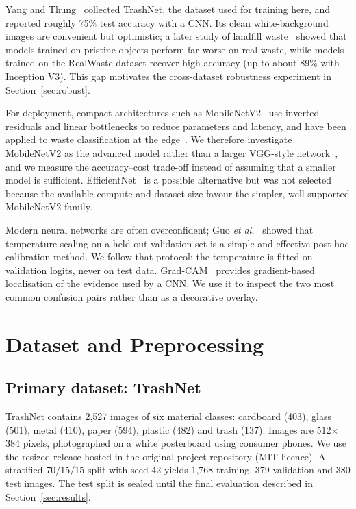 \documentclass[11pt,a4paper]{article}
\begin{document}
Yang and Thung~\citep{yang2016trashnet} collected TrashNet, the dataset used for training
here, and reported roughly 75\% test accuracy with a CNN. Its clean white-background
images are convenient but optimistic; a later study of landfill waste~\citep{single2023realwaste}
showed that models trained on pristine objects perform far worse on real waste, while
models trained on the RealWaste dataset recover high accuracy (up to about 89\% with
Inception V3). This gap motivates the cross-dataset robustness experiment in
Section~\ref{sec:robust}.

For deployment, compact architectures such as MobileNetV2~\citep{sandler2018mobilenetv2}
use inverted residuals and linear bottlenecks to reduce parameters and latency, and have
been applied to waste classification at the edge~\citep{white2020wastenet}. We therefore
investigate MobileNetV2 as the advanced model rather than a larger VGG-style
network~\citep{simonyan2014vgg}, and we measure the accuracy--cost trade-off instead of
assuming that a smaller model is sufficient. EfficientNet~\citep{tan2019efficientnet} is a
possible alternative but was not selected because the available compute and dataset size
favour the simpler, well-supported MobileNetV2 family.

Modern neural networks are often overconfident; Guo \emph{et al.}~\citep{guo2017calibration}
showed that temperature scaling on a held-out validation set is a simple and effective
post-hoc calibration method. We follow that protocol: the temperature is fitted on
validation logits, never on test data. Grad-CAM~\citep{selvaraju2017gradcam} provides
gradient-based localisation of the evidence used by a CNN. We use it to inspect the two
most common confusion pairs rather than as a decorative overlay.

\section{Dataset and Preprocessing}
\label{sec:data}

\subsection{Primary dataset: TrashNet}
TrashNet contains 2,527 images of six material classes: cardboard (403), glass (501),
metal (410), paper (594), plastic (482) and trash (137). Images are 512$\times$384 pixels,
photographed on a white posterboard using consumer phones. We use the resized release
hosted in the original project repository (MIT licence). A stratified 70/15/15 split with
seed 42 yields 1,768 training, 379 validation and 380 test images. The test split is sealed
until the final evaluation described in Section~\ref{sec:results}.
\end{document}
